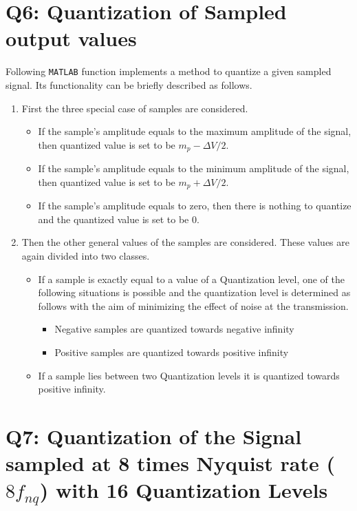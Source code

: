 \documentclass[a4paper,11pt]{article}%
\begin{document}
\pagebreak
\section*{Q6: Quantization of Sampled output values}

Following {\tt MATLAB} function implements a method to quantize a given sampled signal. Its functionality can be briefly described as follows.
\begin{enumerate}[]
	\item First the three special case of samples are considered.
	\begin{itemize}
		\item If the sample's amplitude equals to the maximum amplitude of the signal, then quantized value is set to be $m_p- \Delta V/2$.
		\item If the sample's amplitude equals to the minimum amplitude of the signal, then quantized value is set to be $m_p+ \Delta V/2$.
		\item If the sample's amplitude equals to zero, then there is nothing to quantize and the quantized value is set to be 0. 
	\end{itemize}
 	\item Then the other general values of the samples are considered. These values are again divided into two classes.
 	\begin{itemize}
 		\item If a sample is exactly equal to a value of a Quantization level, one of the following situations is possible and the quantization level is determined as follows with the aim of minimizing the effect of noise at the transmission.
 		\begin{itemize}
 			\item Negative samples are quantized towards negative infinity
 			\item Positive samples are quantized towards positive infinity
 		\end{itemize}
 		\item If a sample lies between two Quantization levels it is  quantized towards positive infinity.
 	\end{itemize}
\end{enumerate}
 




\pagebreak
\section*{Q7: Quantization of the Signal sampled at 8 times Nyquist rate ($8f_{nq}$) with 16 Quantization Levels}
\end{document}
